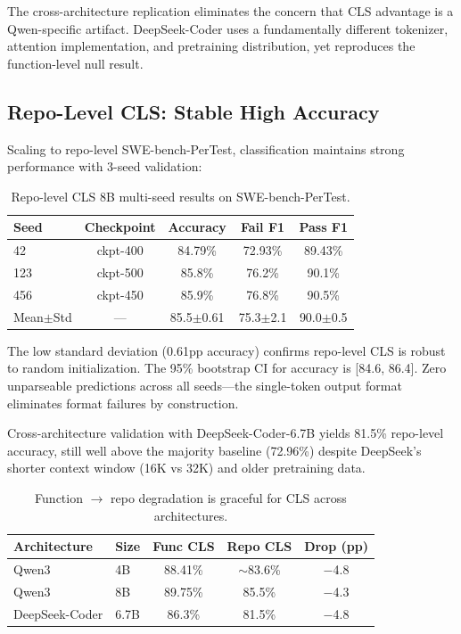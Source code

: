 \documentclass[11pt]{article}
\begin{document}
The cross-architecture replication eliminates the concern that CLS advantage is a Qwen-specific artifact. DeepSeek-Coder uses a fundamentally different tokenizer, attention implementation, and pretraining distribution, yet reproduces the function-level null result.

\subsection{Repo-Level CLS: Stable High Accuracy}
\label{sec:repo-cls}

Scaling to repo-level SWE-bench-PerTest, classification maintains strong performance with 3-seed validation:

\begin{table}[h]
\centering
\caption{Repo-level CLS 8B multi-seed results on SWE-bench-PerTest.}
\label{tab:repo-cls}
\begin{tabular}{lcccc}
\toprule
Seed & Checkpoint & Accuracy & Fail F1 & Pass F1 \\
\midrule
42 & ckpt-400 & 84.79\% & 72.93\% & 89.43\% \\
123 & ckpt-500 & 85.8\% & 76.2\% & 90.1\% \\
456 & ckpt-450 & 85.9\% & 76.8\% & 90.5\% \\
\midrule
Mean$\pm$Std & --- & 85.5$\pm$0.61 & 75.3$\pm$2.1 & 90.0$\pm$0.5 \\
\bottomrule
\end{tabular}
\end{table}

The low standard deviation (0.61pp accuracy) confirms repo-level CLS is robust to random initialization. The 95\% bootstrap CI for accuracy is [84.6, 86.4]. Zero unparseable predictions across all seeds---the single-token output format eliminates format failures by construction.

Cross-architecture validation with DeepSeek-Coder-6.7B yields 81.5\% repo-level accuracy, still well above the majority baseline (72.96\%) despite DeepSeek's shorter context window (16K vs 32K) and older pretraining data.

\begin{table}[h]
\centering
\caption{Function $\to$ repo degradation is graceful for CLS across architectures.}
\label{tab:cls-drop}
\begin{tabular}{llccc}
\toprule
Architecture & Size & Func CLS & Repo CLS & Drop (pp) \\
\midrule
Qwen3 & 4B & 88.41\% & $\sim$83.6\% & $-$4.8 \\
Qwen3 & 8B & 89.75\% & 85.5\% & $-$4.3 \\
DeepSeek-Coder & 6.7B & 86.3\% & 81.5\% & $-$4.8 \\
\bottomrule
\end{tabular}
\end{table}
\end{document}
